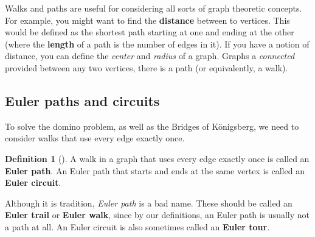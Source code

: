 \documentclass[10pt,]{book}
\newcommand{\terminology}[1]{\textbf{#1}}
\theoremstyle{plain}
\theoremstyle{definition}
\newtheorem{definition}[theorem]{Definition}
\theoremstyle{definition}
\theoremstyle{definition}
\numberwithin{equation}{chapter}
\begin{document}
\par
\hypertarget{p-134}{}%
Walks and paths are useful for considering all sorts of graph theoretic concepts.  For example, you might want to find the \terminology{distance} between to vertices.  This would be defined as the shortest path starting at one and ending at the other (where the \terminology{length} of a path is the number of edges in it).  If you have a notion of distance, you can define the \emph{center} and \emph{radius} of a graph.  Graphs a \emph{connected} provided between any two vertices, there is a path (or equivalently, a walk).%
\typeout{************************************************}
\typeout{************************************************}
\subsection[{Euler paths and circuits}]{Euler paths and circuits}\label{subsec_eulerpaths}
\hypertarget{p-135}{}%
To solve the domino problem, as well as the Bridges of Königsberg, we need to consider walks that use every edge exactly once.%
\begin{definition}[{}]\label{def-eulerpath}
\hypertarget{p-136}{}%
A walk in a graph that uses every edge exactly once is called an \terminology{Euler path}.  An Euler path that starts and ends at the same vertex is called an \terminology{Euler circuit}.%
\end{definition}
\hypertarget{p-137}{}%
Although it is tradition, \emph{Euler path} is a bad name.  These should be called an \terminology{Euler trail} or \terminology{Euler walk}, since by our definitions, an Euler path is usually not a path at all.  An Euler circuit is also sometimes called an \terminology{Euler tour}.%
\end{document}
